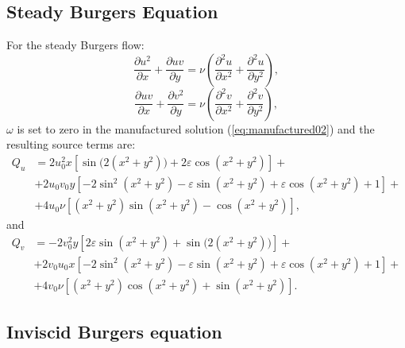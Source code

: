 \documentclass[10pt]{article}
\newcommand{\diff}[2] {\dfrac{\partial #1}{\partial #2}}
\begin{document}
\subsection{Steady Burgers Equation}
For the steady Burgers flow:
\begin{equation}
 \label{eq:burgers2d_03}
 \diff{ u^2 }{x}+\diff{uv}{y}=\nu \left( \diff{^2u}{ x^2}+ \diff{^2u }{y^2}\right),
\end{equation}
\begin{equation}
  \label{eq:burgers2d_04}
 \diff{ u v}{x} + \diff{  v^2 }{y}=\nu \left( \diff{^2v}{ x^2}+ \diff{^2v }{y^2}\right),
\end{equation}
%
$\omega$ is set to zero in the manufactured solution (\ref{eq:manufactured02}) and the resulting source terms are:
\begin{equation}
\begin{split}
Q_u&=2 u_0^2 x [\sin\big(2(x^2+y^2)\big)+2 \varepsilon \cos(x^2+y^2)]+\\
&+  2u_0 v_0 y [-2 \sin^2(x^2+y^2)-\varepsilon \sin(x^2+y^2)+\varepsilon \cos(x^2+y^2)+1] +\\
&+ 4 u_0 \nu [ (x^2 +y^2 )\sin(x^2+y^2)-\cos(x^2+y^2)],
 \end{split}
\end{equation}
and
\begin{equation}
\begin{split}
Q_v&=-2 v_0^2 y[2 \varepsilon \sin(x^2+y^2)+\sin\big(2(x^2+y^2)\big)] +\\
&+  2 v_0 u_0 x[-2 \sin^2(x^2+y^2)-\varepsilon \sin(x^2+y^2)+\varepsilon \cos(x^2+y^2)+1] +\\
&+  4v_0 \nu[( x^2 + y^2) \cos(x^2+y^2)+ \sin(x^2+y^2)].
 \end{split}
\end{equation}



\subsection{Inviscid Burgers equation}
\end{document}
